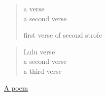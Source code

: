 \label{poem:1}
\begin{verse}
a verse \\
a second verse

first verse of second strofe

\end{verse}
\label{poem:2}
\begin{verse}
Lulu verse \\
a second verse \\
a third verse

\end{verse}
\hyperref[poem:2]{A poem}

